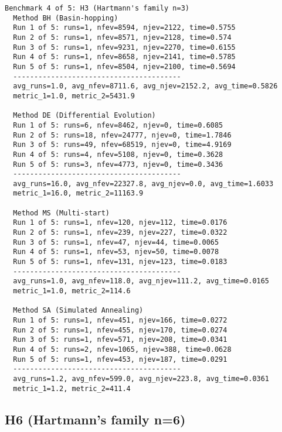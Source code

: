 \footnotesize
\begin{verbatim}
Benchmark 4 of 5: H3 (Hartmann's family n=3)
  Method BH (Basin-hopping)
  Run 1 of 5: runs=1, nfev=8594, njev=2122, time=0.5755
  Run 2 of 5: runs=1, nfev=8571, njev=2128, time=0.574
  Run 3 of 5: runs=1, nfev=9231, njev=2270, time=0.6155
  Run 4 of 5: runs=1, nfev=8658, njev=2141, time=0.5785
  Run 5 of 5: runs=1, nfev=8504, njev=2100, time=0.5694
  ----------------------------------------
  avg_runs=1.0, avg_nfev=8711.6, avg_njev=2152.2, avg_time=0.5826
  metric_1=1.0, metric_2=5431.9

  Method DE (Differential Evolution)
  Run 1 of 5: runs=6, nfev=8462, njev=0, time=0.6085
  Run 2 of 5: runs=18, nfev=24777, njev=0, time=1.7846
  Run 3 of 5: runs=49, nfev=68519, njev=0, time=4.9169
  Run 4 of 5: runs=4, nfev=5108, njev=0, time=0.3628
  Run 5 of 5: runs=3, nfev=4773, njev=0, time=0.3436
  ----------------------------------------
  avg_runs=16.0, avg_nfev=22327.8, avg_njev=0.0, avg_time=1.6033
  metric_1=16.0, metric_2=11163.9

  Method MS (Multi-start)
  Run 1 of 5: runs=1, nfev=120, njev=112, time=0.0176
  Run 2 of 5: runs=1, nfev=239, njev=227, time=0.0322
  Run 3 of 5: runs=1, nfev=47, njev=44, time=0.0065
  Run 4 of 5: runs=1, nfev=53, njev=50, time=0.0078
  Run 5 of 5: runs=1, nfev=131, njev=123, time=0.0183
  ----------------------------------------
  avg_runs=1.0, avg_nfev=118.0, avg_njev=111.2, avg_time=0.0165
  metric_1=1.0, metric_2=114.6

  Method SA (Simulated Annealing)
  Run 1 of 5: runs=1, nfev=451, njev=166, time=0.0272
  Run 2 of 5: runs=1, nfev=455, njev=170, time=0.0274
  Run 3 of 5: runs=1, nfev=571, njev=208, time=0.0341
  Run 4 of 5: runs=2, nfev=1065, njev=388, time=0.0628
  Run 5 of 5: runs=1, nfev=453, njev=187, time=0.0291
  ----------------------------------------
  avg_runs=1.2, avg_nfev=599.0, avg_njev=223.8, avg_time=0.0361
  metric_1=1.2, metric_2=411.4

\end{verbatim}

\subsection{H6 (Hartmann's family n=6)}

